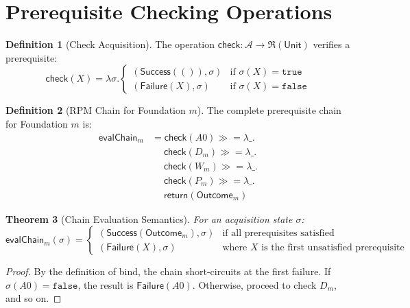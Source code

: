 \documentclass[11pt,twoside,openright]{book}
\theoremstyle{definition}
\newtheorem{definition}{Definition}[chapter]
\theoremstyle{plain}
\newtheorem{theorem}[definition]{Theorem}
\theoremstyle{remark}
\newcommand{\Acquisitions}{\mathcal{A}}
\newcommand{\RPM}{\mathfrak{R}}
\newcommand{\rpmret}{\mathsf{return}}
\newcommand{\rpmbind}{\mathbin{\gg\!=}}
\begin{document}
\section{Prerequisite Checking Operations}

\begin{definition}[Check Acquisition]
\label{def:check-acq}
The operation $\mathsf{check} : \Acquisitions \to \RPM(\mathsf{Unit})$ verifies a prerequisite:
\[
\mathsf{check}(X) = \lambda \sigma. \begin{cases}
(\mathsf{Success}(()), \sigma) & \text{if } \sigma(X) = \mathtt{true} \\
(\mathsf{Failure}(X), \sigma) & \text{if } \sigma(X) = \mathtt{false}
\end{cases}
\]
\end{definition}

\begin{definition}[RPM Chain for Foundation $m$]
\label{def:rpm-chain}
The complete prerequisite chain for Foundation $m$ is:
\begin{align}
\mathsf{evalChain}_m &= \mathsf{check}(A0) \rpmbind \lambda \_. \\
&\quad\; \mathsf{check}(D_m) \rpmbind \lambda \_. \\
&\quad\; \mathsf{check}(W_m) \rpmbind \lambda \_. \\
&\quad\; \mathsf{check}(P_m) \rpmbind \lambda \_. \\
&\quad\; \rpmret(\mathsf{Outcome}_m)
\end{align}
\end{definition}

\begin{theorem}[Chain Evaluation Semantics]
\label{thm:chain-eval}
For an acquisition state $\sigma$:
\[
\mathsf{evalChain}_m(\sigma) = \begin{cases}
(\mathsf{Success}(\mathsf{Outcome}_m), \sigma) & \text{if all prerequisites satisfied} \\
(\mathsf{Failure}(X), \sigma) & \text{where } X \text{ is the first unsatisfied prerequisite}
\end{cases}
\]
\end{theorem}

\begin{proof}
By the definition of bind, the chain short-circuits at the first failure. If $\sigma(A0) = \mathtt{false}$, the result is $\mathsf{Failure}(A0)$. Otherwise, proceed to check $D_m$, and so on.
\end{proof}
\end{document}
